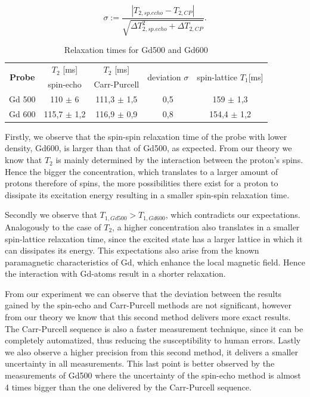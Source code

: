 $$\sigma := \frac{|T_{2, sp. echo} - T_{2, CP}|}{\sqrt{\Delta T_{2,sp. echo}^2 + \Delta T_{2,CP}}}.$$
\begin{table}[!htbp]
 \begin{center}
  \caption{Relaxation times for Gd500 and Gd600}
  \label{tab: relaxation times}
  \begin{tabular}{|c||c|c|c|c|}
	\hline
	\multirow{2}{*}{\textbf{Probe}} & $T_2$ [ms]& $T_2$ [ms]&\multirow{2}{*}{deviation $\sigma$} &\multirow{2}{*}{ spin-lattice $T_1$[ms]}\\
	& spin-echo & Carr-Purcell &  &\\
	\hline
	\hline	
	Gd 500 & 110 $\pm$ 6 & 111,3 $\pm$ 1,5 & 0,5 & 159 $\pm$ 1,3 \\
	Gd 600 & 115,7 $\pm$ 1,2 & 116,9 $\pm$ 0,9 & 0,8 & 154,4 $\pm$ 1,2 \\
	\hline
  \end{tabular}
 \end{center}
\end{table}

Firstly, we observe that the spin-spin relaxation time of the probe with lower density, Gd600, is larger than that of Gd500, as expected. From our theory we know that $T_2$ is mainly determined by the interaction between the proton's spins. Hence the bigger the concentration, which translates to a larger amount of protons therefore of spins, the  more possibilities there exist for a proton to dissipate its excitation energy resulting in a smaller spin-spin relaxation time. 

Secondly we observe that $T_{1, Gd500} > T_{1,Gd600}$, which contradicts our expectations. Analogously to the case of $T_2$, a higher concentration also translates in a smaller spin-lattice relaxation time, since the excited state has a larger lattice in which it can dissipates its energy. This expectations also arise from the known paramagnetic characteristics of Gd, which enhance the local magnetic field. Hence the interaction with Gd-atoms result in a shorter relaxation. 


From our experiment we can observe that the deviation between the results gained by the spin-echo and Carr-Purcell methods are not significant, however from our theory we know that this second method delivers more exact results. The Carr-Purcell sequence is also a faster measurement technique, since it can be completely automatized, thus reducing the susceptibility to human errors. Lastly we also observe a higher precision from this second method, it delivers a smaller uncertainty in all measurements. This last point is better observed by the measurements of Gd500 where the uncertainty of the spin-echo method is almost 4 times bigger than the one delivered by the Carr-Purcell sequence. 
